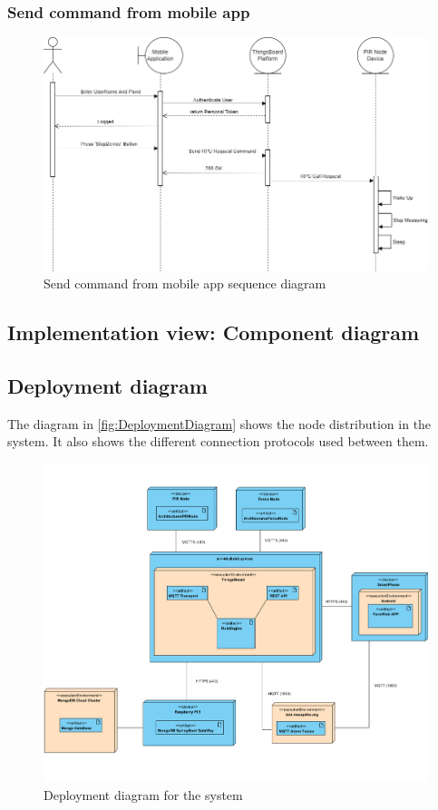 \subsubsection*{Send command from mobile app}

\begin{figure}[H]
    \centering
    \includegraphics[width=1\textwidth]{./images/6/SendCommandApp.png}
    \caption{Send command from mobile app sequence diagram}
\end{figure}

\clearpage
\subsection{Implementation view: Component diagram}

\clearpage
\subsection{Deployment diagram}

The diagram in \autoref{fig:DeploymentDiagram} shows the node distribution in the system. It also shows the 
different connection protocols used between them.

\begin{figure}[H]
    \centering
    \includegraphics[width=1\textwidth]{./images/6/Deployment.png}
    \caption{Deployment diagram for the system}
    \label{fig:DeploymentDiagram}
\end{figure}
